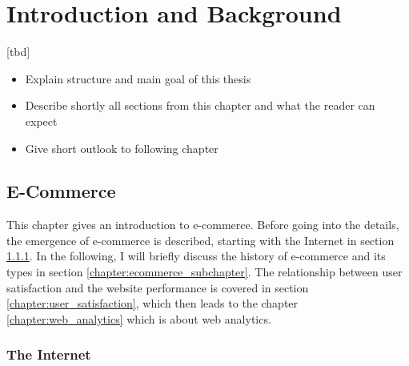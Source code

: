 \chapter{Introduction and Background}

[tbd]

\begin{itemize}
	\item Explain structure and main goal of this thesis
	\item Describe shortly all sections from this chapter and what the reader can expect
	\item Give short outlook to following chapter
\end{itemize}





\section{E-Commerce}
\label{chapter:e-commerce}

This chapter gives an introduction to e-commerce.
Before going into the details, the emergence of e-commerce is described, starting with the Internet in section \ref{chapter:internet}.
In the following, I will briefly discuss the history of e-commerce and its types in section \ref{chapter:ecommerce_subchapter}.
The relationship between user satisfaction and the website performance is covered in section \ref{chapter:user_satisfaction}, which then leads to the chapter \ref{chapter:web_analytics} which is about web analytics.



\subsection{The Internet}
\label{chapter:internet}

